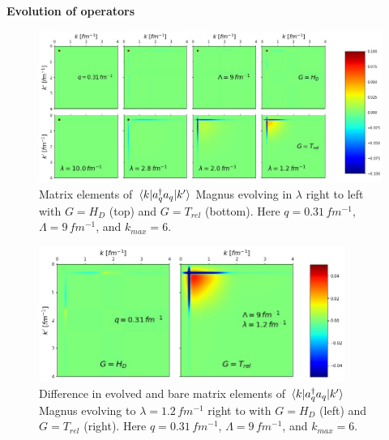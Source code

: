 \documentclass[preprintnumbers,floatfix,aps,prc,preprint,nofootinbib]{revtex4-1}
\begin{document}
%
\textbf{Evolution of operators}
%
\begin{figure}[H]
  \captionsetup{singlelinecheck=false,justification=raggedright}
  \centering
  \includegraphics[width=14cm]{momentum_proj_operator_contours_q0,31_magnus_Wendt_Lamb9}
  \hspace*{0.05\textwidth}
  \caption{Matrix elements of $\mel{k}{a^{\dagger}_q a_q}{k'}$ Magnus evolving in $\lambda$ right to left with $G=H_D$ (top) and $G=T_{rel}$ (bottom). Here $q=0.31 \, fm^{-1}$, $\Lambda=9 \, fm^{-1}$, and $k_{max}=6$.}
  \label{fig:momentum_proj_operator_contours_q0,31_magnus_Wendt_Lamb9}
\end{figure}
%
\begin{figure}[H]
  \captionsetup{singlelinecheck=false,justification=raggedright}
  \centering
  \includegraphics[width=10cm]{momentum_proj_difference_q0,31_magnus_Wendt_Lamb9}
  \hspace*{0.05\textwidth}
  \caption{Difference in evolved and bare matrix elements of $\mel{k}{a^{\dagger}_q a_q}{k'}$ Magnus evolving to $\lambda=1.2 \, fm^{-1}$ right to with $G=H_D$ (left) and $G=T_{rel}$ (right). Here $q=0.31 \, fm^{-1}$, $\Lambda=9 \, fm^{-1}$, and $k_{max}=6$.}
  \label{fig:momentum_proj_operator_difference_q0,31_magnus_Wendt_Lamb9}
\end{figure}
%
\end{document}
